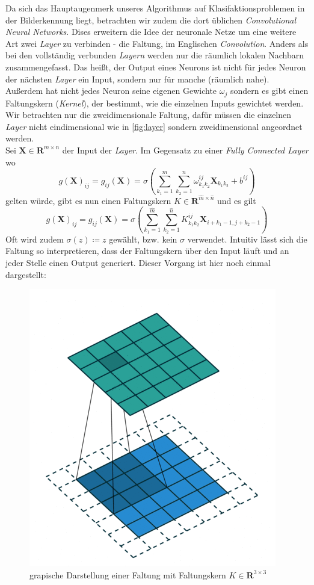 \documentclass[]{scrartcl}
\newcommand{\R}{\mathbf{R}}
\begin{document}
			Da sich das Hauptaugenmerk unseres Algorithmus auf Klasifaktionsproblemen in der Bilderkennung liegt, betrachten wir zudem die dort üblichen \textit{Convolutional Neural Networks}.
			Dises erweitern die Idee der neuronale Netze um eine weitere Art zwei \textit{Layer} zu verbinden - die Faltung, im Englischen \textit{Convolution}.
			Anders als bei den vollständig verbunden \textit{Layern} werden nur die räumlich lokalen Nachbarn zusammengefasst. Das heißt, der Output eines Neurons ist nicht für jedes Neuron der nächsten
			\textit{Layer} ein Input, sondern nur für manche (räumlich nahe). Außerdem hat nicht jedes Neuron seine eigenen Gewichte $\omega_j$ sondern es gibt einen Faltungskern (\textit{Kernel}),
			der bestimmt, wie die einzelnen Inputs gewichtet werden.
			Wir betrachten nur die zweidimensionale Faltung, dafür müssen die einzelnen \textit{Layer} nicht eindimensional wie in \ref{fig:layer}
			sondern zweidimensional angeordnet werden. \\
			Sei $\mathbf{X} \in \R^{m \times n}$ der Input der \textit{Layer}. Im Gegensatz zu einer \textit{Fully Connected Layer} wo\\
			$$g(\mathbf{X})_{ij} = g_{ij}(\mathbf{X}) = \sigma(\sum_{k_1=1}^m \sum_{k_2=1}^n \omega_{k_1k_2}^{ij}\mathbf{X}_{k_1k_2} + b^{ij})$$
			gelten würde, gibt es nun einen Faltungskern $K \in \R^{\hat{m} \times \hat{n}}$ und es gilt
			$$g(\mathbf{X})_{ij} = g_{ij}(\mathbf{X}) = \sigma(\sum_{k_1=1}^{\hat{m}} \sum_{k_2=1}^{\hat{n}} K_{k_1k_2}^{ij} \mathbf{X}_{i + k_1 - 1, j + k_2 - 1})$$
			Oft wird zudem $\sigma(z) \coloneqq z$ gewählt, bzw. kein $\sigma$ verwendet.
			Intuitiv lässt sich die Faltung so interpretieren, dass der Faltungskern über den Input läuft und an jeder Stelle einen Output generiert. Dieser Vorgang ist hier noch einmal dargestellt:

			\begin{figure}[h]
				\centering
				\includegraphics[scale=0.7]{img/convolution.png}
				\caption{grapische Darstellung einer Faltung mit Faltungskern $K \in \R^{3 \times 3}$ \cite{convo}}
				\label{fig:convo}
			\end{figure}
\end{document}
